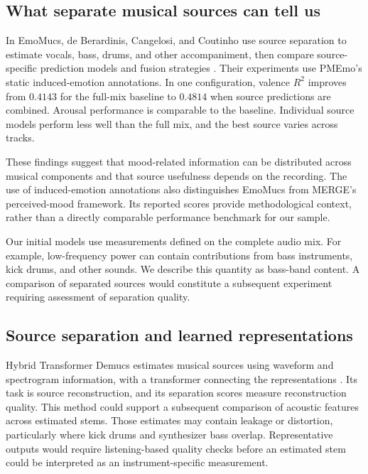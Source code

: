 \subsection{What separate musical sources can tell us}

In EmoMucs, de Berardinis, Cangelosi, and Coutinho use source separation to estimate vocals, bass, drums, and other accompaniment, then compare source-specific prediction models and fusion strategies \cite[Secs.~3--4]{deberardinis2020emomucs}. Their experiments use PMEmo's static induced-emotion annotations. In one configuration, valence $R^2$ improves from $0.4143$ for the full-mix baseline to $0.4814$ when source predictions are combined. Arousal performance is comparable to the baseline. Individual source models perform less well than the full mix, and the best source varies across tracks.

These findings suggest that mood-related information can be distributed across musical components and that source usefulness depends on the recording. The use of induced-emotion annotations also distinguishes EmoMucs from MERGE's perceived-mood framework. Its reported scores provide methodological context, rather than a directly comparable performance benchmark for our sample.

Our initial models use measurements defined on the complete audio mix. For example, low-frequency power can contain contributions from bass instruments, kick drums, and other sounds. We describe this quantity as bass-band content. A comparison of separated sources would constitute a subsequent experiment requiring assessment of separation quality.

\subsection{Source separation and learned representations}

Hybrid Transformer Demucs estimates musical sources using waveform and spectrogram information, with a transformer connecting the representations \cite{rouard2023demucs}. Its task is source reconstruction, and its separation scores measure reconstruction quality. This method could support a subsequent comparison of acoustic features across estimated stems. Those estimates may contain leakage or distortion, particularly where kick drums and synthesizer bass overlap. Representative outputs would require listening-based quality checks before an estimated stem could be interpreted as an instrument-specific measurement.

